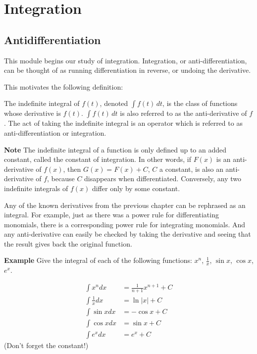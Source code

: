 \documentclass[twoside,openright,titlepage,a4paper]{book}
\begin{document}
\begin{sloppypar}
\chapter{Integration} \label{ChIntegration}

\section{Antidifferentiation} \label{ChIntegrationSecAntidifferentiation}

This module begins our study of integration. Integration, or anti-differentiation, can be thought of as running differentiation in reverse, or undoing the derivative.

This motivates the following definition:

\begin{definitionbox}[title=\textbf{The Indefinite Integral}]
The indefinite integral of $f(t)$, denoted $\int f(t)\,dt$, is the class of functions whose derivative is $f(t)$. $\int f(t)\,dt$ is also referred to as the anti-derivative of $f$. The act of taking the indefinite integral is an operator which is referred to as anti-differentiation or integration.	
\end{definitionbox}	

\textbf{Note} The indefinite integral of a function is only defined up to an added constant, called the constant of integration. In other words, if $F(x)$ is an anti-derivative of $f(x)$, then $G(x)=F(x)+C$, $C$ a constant, is also an anti-derivative of $f$, because $C$ disappears when differentiated. Conversely, any two indefinite integrals of $f(x)$ differ only by some constant.

Any of the known derivatives from the previous chapter can be rephrased as an integral. For example, just as there was a power rule for differentiating monomials, there is a corresponding power rule for integrating monomials. And any anti-derivative can easily be checked by taking the derivative and seeing that the result gives back the original function.

\textbf{Example} Give the integral of each of the following functions: $x^n$, $\frac{1}{x}$, $\sin x$, $\cos x$, $e^x$.
\begin{examplebox}
\begin{align*}
\int x^n dx &= \frac{1}{n+1}x^{n+1} + C \\
\int \frac{1}{x} dx &= \ln |x| + C \\
\int \sin x dx &= - \cos x + C \\
\int \cos x dx &= \sin x + C \\
\int e^x dx &= e^x + C 
\end{align*}
(Don't forget the constant!)	
\end{examplebox}	


\end{sloppypar}
\end{document}

